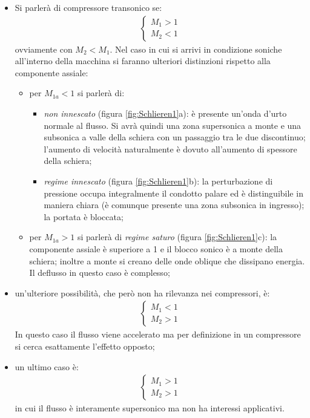 \begin{itemize}
	\item Si parlerà di compressore transonico se:
	\begin{align*}
	\begin{cases}
	M_1 >1\\
	M_2 <1
	\end{cases}
	\end{align*} 
	ovviamente con $M_2<M_1$. Nel caso in cui si arrivi in condizione soniche all'interno della macchina si faranno ulteriori distinzioni rispetto alla componente assiale: 
	\begin{itemize}
		\item per $M_{1a} < 1 $ si parlerà di:
		\begin{itemize}
			\item \textit{non innescato} (figura \ref{fig:Schlieren1}a): è presente un'onda d'urto normale al flusso. Si avrà quindi una zona supersonica a monte e una subsonica a valle della schiera con un passaggio tra le due discontinuo; l'aumento di velocità naturalmente è dovuto all'aumento di spessore della schiera;
			\item \textit{regime innescato} (figura \ref{fig:Schlieren1}b): la perturbazione di pressione occupa integralmente il condotto palare ed è distinguibile in maniera chiara (è comunque presente una zona subsonica in ingresso); la portata è bloccata; 
		\end{itemize}
		\item per $ M_{1a} > 1 $ si parlerà di \textit{regime saturo} (figura \ref{fig:Schlieren1}c): la componente assiale è superiore a 1 e il blocco sonico è a monte della schiera; inoltre a monte si creano delle onde oblique che dissipano energia. Il deflusso in questo caso è complesso;
	\end{itemize}
	\item un'ulteriore possibilità, che però non ha rilevanza nei compressori, è:
	\begin{align*}
	\begin{cases}
	M_1 <1\\
	M_2 >1
	\end{cases}
	\end{align*} 
	In questo caso il flusso viene accelerato ma per definizione in un compressore si cerca esattamente l'effetto opposto;
	\item un ultimo caso è:
	\begin{align*}
	\begin{cases}
	M_1 >1\\
	M_2 >1
	\end{cases}
	\end{align*} 
	in cui il flusso è interamente supersonico ma non ha interessi applicativi.
\end{itemize}

